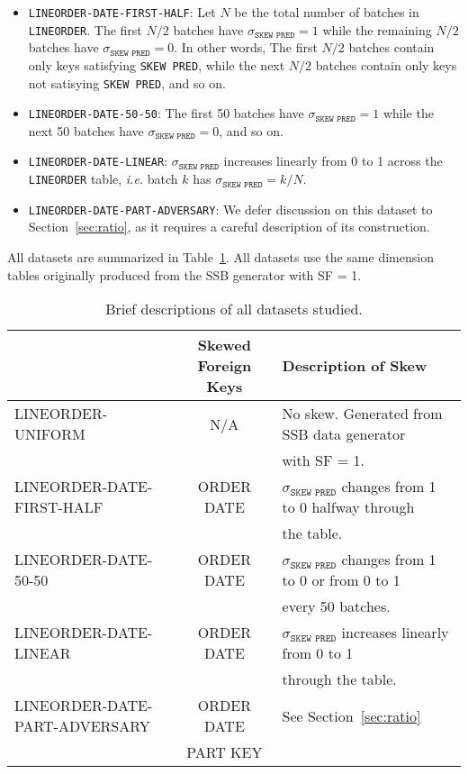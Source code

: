 \begin{itemize}
    \item \texttt{LINEORDER-DATE-FIRST-HALF}: Let $N$ be the total number of batches in \texttt{LINEORDER}. 
    The first $N/2$ batches have $\sigma_{\texttt{SKEW PRED}} = 1$ while the remaining $N/2$ batches have $\sigma_{\texttt{SKEW PRED}} = 0$.
    In other words, The first $N/2$ batches contain only keys satisfying \texttt{SKEW PRED}, 
    while the next $N/2$ batches contain only keys not satisying \texttt{SKEW PRED}, 
    and so on. 

    \item \texttt{LINEORDER-DATE-50-50}: The first 50 batches have $\sigma_{\texttt{SKEW PRED}} = 1$ while the next 50 batches have $\sigma_{\texttt{SKEW PRED}} = 0$, and so on.

    \item \texttt{LINEORDER-DATE-LINEAR}: $\sigma_{\texttt{SKEW PRED}}$ increases linearly from 0 to 1 across the \texttt{LINEORDER} table, 
    {\it i.e.} batch $k$ has $\sigma_{\texttt{SKEW PRED}} = k/N$.

    \item \texttt{LINEORDER-DATE-PART-ADVERSARY}: We defer discussion on this dataset to Section~\ref{sec:ratio}, 
    as it requires a careful description of its construction.

\end{itemize} 


All datasets are summarized in Table~\ref{tab:skew_datasets}. All datasets use the same dimension tables originally produced from the SSB generator with SF = 1.

\begin{table}
\begin{center}
\begin{tabular}{ |>{\ttfamily}l|>{\ttfamily}c|l| } 
\hline
{\bf Dataset Name} & {\bf Skewed Foreign Keys} & {\bf Description of Skew} \\
\hline
\hline
LINEORDER-UNIFORM& N/A & No skew. Generated from SSB data generator\\
& & with SF = 1.\\
\hline
LINEORDER-DATE-FIRST-HALF& ORDER DATE & $\sigma_{\texttt{SKEW PRED}}$ changes from 1 to 0 halfway through\\
& &  the table.\\
\hline
LINEORDER-DATE-50-50& ORDER DATE & $\sigma_{\texttt{SKEW PRED}}$ changes from 1 to 0 or from 0 to 1 \\
& & every 50 batches. \\ 
\hline
LINEORDER-DATE-LINEAR& ORDER DATE & $\sigma_{\texttt{SKEW PRED}}$ increases linearly from 0 to 1 \\
& & through the table. \\
\hline
LINEORDER-DATE-PART-ADVERSARY& ORDER DATE & See Section~\ref{sec:ratio}\\
& PART KEY & \\
\hline

\end{tabular}
\end{center}

\caption{Brief descriptions of all datasets studied.}
\label{tab:skew_datasets}
\end{table}

